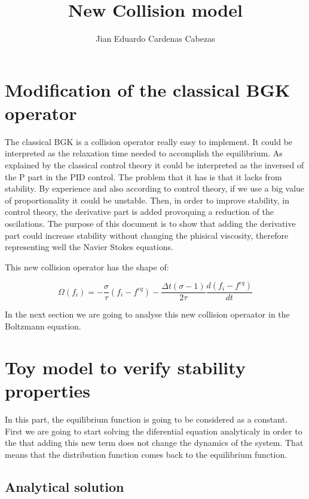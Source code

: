 \documentclass{article}
\title{\textbf{New Collision model}}
\author{Jian Eduardo Cardenas Cabezas}
\begin{document}
\maketitle

\section{Modification of the classical BGK operator}
The classical BGK is a collision operator really easy to implement. It could be interpreted as the relaxation time needed to accomplish the equilibrium.
As explained by the classical control theory it could be interpreted as the inversed of the P part in the PID control. The problem that it has is that it lacks from stability.
By experience and also according to control theory, if we use a big value of proportionality it could be unstable. Then, in order to improve stability, in control theory,
the derivative part is added provoquing a reduction of the oscilations. 
The purpose of this document is to show that adding the derivative part could increase stability without changing the phisical viscosity, therefore representing well the
Navier Stokes equations.

This new collision operator has the shape of:

\begin{equation}
    \Omega(f_i) = -\frac{\sigma}{\tau}(f_i-f^{eq}) - \frac{\Delta t(\sigma-1)}{2\tau}\frac{d(f_i-f^{eq})}{dt}    
\end{equation}

In the next section we are going to analyse this new collision operaator in the Boltzmann equation.


\section{Toy model to verify stability properties}

In this part, the equilibrium function is going to be considered as a constant.
First we are going to start solving the diferential equation analyticaly in order to the that adding this new term does not change the dynamics of the system.
That means that the distribution function comes back to the equilibrium function.

\subsection{Analytical solution}
\end{document}
